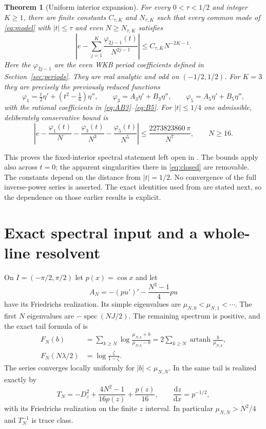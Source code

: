 \documentclass[10pt]{article}
\newtheorem{theorem}{Theorem}
\newcommand{\dd}{\mathrm d}
\newcommand{\artanh}{\operatorname{artanh}}
\newcommand{\ph}{\varphi}
\begin{document}
\begin{theorem}[Uniform interior expansion]\label{thm:main}
For every $0<\tau<1/2$ and integer $K\ge1$, there are finite constants
$C_{\tau,K}$ and $N_{\tau,K}$ such that every common mode of
\eqref{eq:model} with $|t|\le\tau$ and even $N\ge N_{\tau,K}$ satisfies
\begin{equation}
\left|e-\sum_{j=1}^K\frac{\ph_{2j-1}(t)}{N^{2j-1}}\right|
\le C_{\tau,K}N^{-2K-1}.
\label{eq:main}
\end{equation}
Here the $\ph_{2j-1}$ are the even WKB period coefficients defined in
Section~\ref{sec:periods}. They are real analytic and odd on $(-1/2,1/2)$.
For $K=3$ they are precisely the previously reduced functions
\begin{equation}
\ph_1=\tfrac t2\eta'+(t^2-\tfrac16)\eta'',\qquad
\ph_3=A_3\eta'+B_3\eta'',\qquad
\ph_5=A_5\eta'+B_5\eta'',
\label{eq:closed}
\end{equation}
with the rational coefficients in \eqref{eq:AB3}--\eqref{eq:B5}.
For $|t|\le1/4$ one admissible, deliberately conservative bound is
\begin{equation}
\left|e-\frac{\ph_1(t)}N-\frac{\ph_3(t)}{N^3}-\frac{\ph_5(t)}{N^5}\right|
\le \frac{2273823860\,\pi}{N^7},\qquad N\ge16.
\label{eq:explicit}
\end{equation}
\end{theorem}

This proves the fixed-interior spectral statement left open in
\cite{periods}. The bounds apply also across $t=0$; the apparent
singularities there in \eqref{eq:closed} are removable. The constants
depend on the distance from $|t|=1/2$. No convergence of the full
inverse-power series is asserted. The exact identities used from
\cite{tails,moments} are stated next, so the dependence on those
earlier results is explicit.

\section{Exact spectral input and a whole-line resolvent}

On $I=(-\pi/2,\pi/2)$ let $p(x)=\cos x$ and let
\[
A_N=-(p u')'-\frac{N^2-1}{4}p u
\]
have its Friedrichs realization. Its simple eigenvalues are
$\mu_{N,0}<\mu_{N,1}<\cdots$. The first $N$ eigenvalues are
$-\operatorname{spec}(NJ/2)$. The remaining spectrum is positive,
and the exact tail formula of \cite{tails} is
\begin{align}
F_N(b)&=\sum_{k\ge N}\log\frac{\mu_{N,k}+b}{\mu_{N,k}-b}
       =2\sum_{k\ge N}\artanh\frac b{\mu_{N,k}},\label{eq:tail}\\
F_N(N\lambda/2)&=\log\frac\zeta{1-\zeta}.\label{eq:mode}
\end{align}
The series converges locally uniformly for $|b|<\mu_{N,N}$.
In \cite{moments} the same tail is realized exactly by
\begin{equation}
T_N=-D_z^2+\frac{4N^2-1}{16p(z)}+\frac{p(z)}{16},\qquad
\frac{\dd z}{\dd x}=p^{-1/2},
\label{eq:positive}
\end{equation}
with its Friedrichs realization on the finite $z$ interval.
In particular $\mu_{N,N}>N^2/4$ and $T_N^{-1}$ is trace class.
\end{document}
